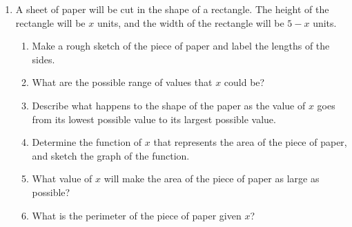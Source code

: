\begin{enumerate}
\item A sheet of paper will be cut in the shape of a rectangle. The
  height of the rectangle will be $x$ units, and the width of the
  rectangle will be $5-x$ units.
  \begin{enumerate}
  \item Make a rough sketch of the piece of paper and label the
    lengths of the sides.
    \vfill
  \item What are the possible range of values that $x$ could be?
    \vfill
  \item Describe what happens to the shape of the paper as the value
    of $x$ goes from its lowest possible value to its largest possible
    value.
    \vfill
  \item Determine the function of $x$ that represents the area of the
    piece of paper, and sketch the graph of the function. \\

  \item What value of $x$ will make the area of the piece of paper as
    large as possible?
    \vfill

  \item What is the perimeter of the piece of paper given $x$?
    
  \end{enumerate}

\end{enumerate}




